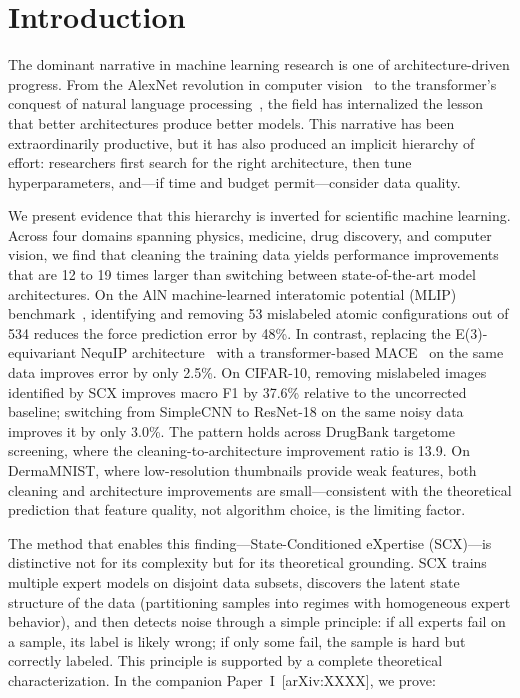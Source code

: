 \section{Introduction}

The dominant narrative in machine learning research is one of architecture-driven progress. From the AlexNet revolution in computer vision~\cite{krizhevsky2012imagenet} to the transformer's conquest of natural language processing~\cite{vaswani2017attention}, the field has internalized the lesson that better architectures produce better models. This narrative has been extraordinarily productive, but it has also produced an implicit hierarchy of effort: researchers first search for the right architecture, then tune hyperparameters, and---if time and budget permit---consider data quality.

We present evidence that this hierarchy is inverted for scientific machine learning. Across four domains spanning physics, medicine, drug discovery, and computer vision, we find that cleaning the training data yields performance improvements that are 12 to 19 times larger than switching between state-of-the-art model architectures. On the AlN machine-learned interatomic potential (MLIP) benchmark~\cite{shapeev2016moment}, identifying and removing 53 mislabeled atomic configurations out of 534 reduces the force prediction error by 48\%. In contrast, replacing the E(3)-equivariant NequIP architecture~\cite{batzner2022e3nn} with a transformer-based MACE~\cite{batatia2022mace} on the same data improves error by only 2.5\%. On CIFAR-10, removing mislabeled images identified by SCX improves macro F1 by 37.6\% relative to the uncorrected baseline; switching from SimpleCNN to ResNet-18 on the same noisy data improves it by only 3.0\%. The pattern holds across DrugBank targetome screening, where the cleaning-to-architecture improvement ratio is 13.9. On DermaMNIST, where low-resolution thumbnails provide weak features, both cleaning and architecture improvements are small---consistent with the theoretical prediction that feature quality, not algorithm choice, is the limiting factor.

The method that enables this finding---State-Conditioned eXpertise (SCX)---is distinctive not for its complexity but for its theoretical grounding. SCX trains multiple expert models on disjoint data subsets, discovers the latent state structure of the data (partitioning samples into regimes with homogeneous expert behavior), and then detects noise through a simple principle: if all experts fail on a sample, its label is likely wrong; if only some fail, the sample is hard but correctly labeled. This principle is supported by a complete theoretical characterization. In the companion Paper~I~[arXiv:XXXX], we prove:

